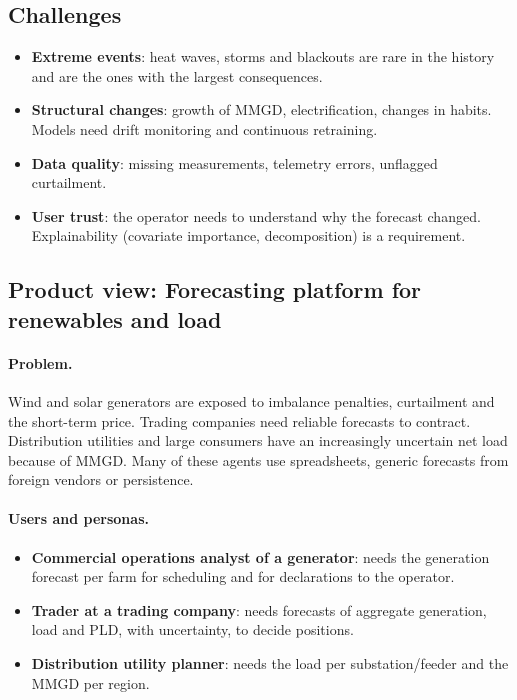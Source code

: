 \documentclass[10pt,a4paper,oneside]{article}
\newcommand{\visaoproduto}[1]{%
  \let\subsectionmarkbase\subsectionmark
  \renewcommand{\subsectionmark}[1]{\markright{\thesubsection\ Product view}}%
  \subsection{Product view: #1}%
  \let\subsectionmark\subsectionmarkbase}
\begin{document}
\subsection{Challenges}
\begin{itemize}
  \item \textbf{Extreme events}: heat waves, storms and blackouts are rare
    in the history and are the ones with the largest consequences.
  \item \textbf{Structural changes}: growth of MMGD, electrification, changes
    in habits. Models need drift monitoring and continuous retraining.
  \item \textbf{Data quality}: missing measurements, telemetry errors,
    unflagged curtailment.
  \item \textbf{User trust}: the operator needs to understand why the
    forecast changed. Explainability (covariate importance, decomposition)
    is a requirement.
\end{itemize}

\visaoproduto{Forecasting platform for renewables and load}

\paragraph{Problem.}
Wind and solar generators are exposed to imbalance penalties, curtailment and
the short-term price. Trading companies need reliable forecasts to contract.
Distribution utilities and large consumers have an increasingly uncertain
net load because of MMGD. Many of these agents use spreadsheets, generic
forecasts from foreign vendors or persistence.

\paragraph{Users and personas.}
\begin{itemize}
  \item \textbf{Commercial operations analyst of a generator}: needs the
    generation forecast per farm for scheduling and for declarations to the
    operator.
  \item \textbf{Trader at a trading company}: needs forecasts of aggregate
    generation, load and PLD, with uncertainty, to decide positions.
  \item \textbf{Distribution utility planner}: needs the load per
    substation/feeder and the MMGD per region.
\end{itemize}
\end{document}
